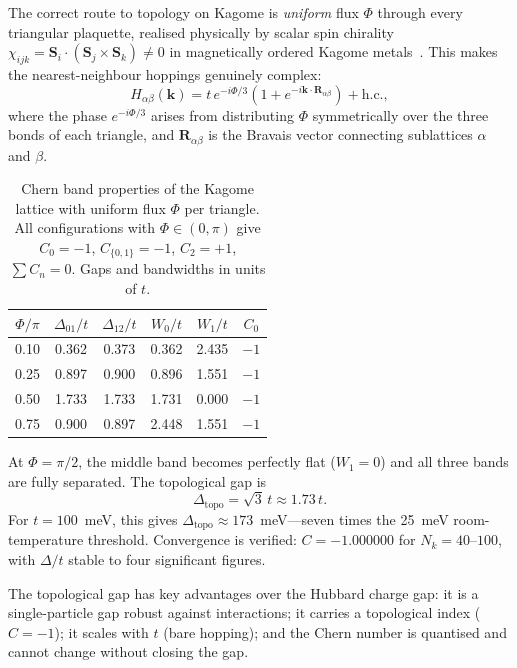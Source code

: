 \documentclass[aps,prb,twocolumn,superscriptaddress,floatfix]{revtex4-2}
\begin{document}
The correct route to topology on Kagome is \emph{uniform} flux $\Phi$ through every triangular plaquette, realised physically by scalar spin chirality $\chi_{ijk} = \mathbf{S}_i \cdot (\mathbf{S}_j \times \mathbf{S}_k) \neq 0$ in magnetically ordered Kagome metals~\cite{ohgushi2000}. This makes the nearest-neighbour hoppings genuinely complex:
\begin{equation}
    H_{\alpha\beta}(\mathbf{k}) = t\,e^{-i\Phi/3}\left(1 + e^{-i\mathbf{k}\cdot\mathbf{R}_{\alpha\beta}}\right) + \text{h.c.},
    \label{eq:H_uniform}
\end{equation}
where the phase $e^{-i\Phi/3}$ arises from distributing $\Phi$ symmetrically over the three bonds of each triangle, and $\mathbf{R}_{\alpha\beta}$ is the Bravais vector connecting sublattices $\alpha$ and $\beta$.

\begin{table}[b]
\caption{Chern band properties of the Kagome lattice with uniform flux $\Phi$ per triangle. All configurations with $\Phi \in (0, \pi)$ give $C_0 = -1$, $C_{\{0,1\}} = -1$, $C_2 = +1$, $\sum C_n = 0$. Gaps and bandwidths in units of $t$.}
\label{tab:chern}
\begin{ruledtabular}
\begin{tabular}{cccccc}
$\Phi/\pi$ & $\Delta_{01}/t$ & $\Delta_{12}/t$ & $W_0/t$ & $W_1/t$ & $C_0$ \\
\hline
0.10 & 0.362 & 0.373 & 0.362 & 2.435 & $-1$ \\
0.25 & 0.897 & 0.900 & 0.896 & 1.551 & $-1$ \\
0.50 & 1.733 & 1.733 & 1.731 & 0.000 & $-1$ \\
0.75 & 0.900 & 0.897 & 2.448 & 1.551 & $-1$ \\
\end{tabular}
\end{ruledtabular}
\end{table}

At $\Phi = \pi/2$, the middle band becomes perfectly flat ($W_1 = 0$) and all three bands are fully separated. The topological gap is
\begin{equation}
    \Delta_{\mathrm{topo}} = \sqrt{3}\,t \approx 1.73\,t.
    \label{eq:gap}
\end{equation}
For $t = 100$~meV, this gives $\Delta_{\mathrm{topo}} \approx 173$~meV---seven times the 25~meV room-temperature threshold. Convergence is verified: $C = -1.000000$ for $N_k = 40$--$100$, with $\Delta/t$ stable to four significant figures.

The topological gap has key advantages over the Hubbard charge gap: it is a single-particle gap robust against interactions; it carries a topological index ($C = -1$); it scales with $t$ (bare hopping); and the Chern number is quantised and cannot change without closing the gap.
\end{document}
